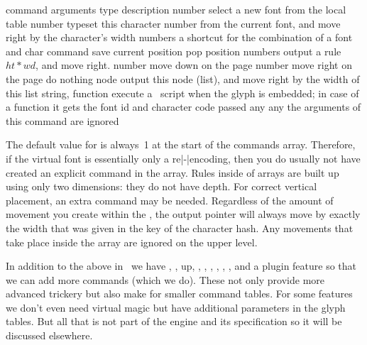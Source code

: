 {\starttabulate[|l|l|l|p|]
\FL
\BC command          \BC arguments \BC type      \BC description \NC \NR
\ML
\NC {}               \NC number    \NC select a new font from the local  table \NC \NR
\NC {}               \NC number    \NC typeset this character number from the current font,
                                                     and move right by the character's width \NC \NR
\NC {}                numbers \NC a shortcut for the combination of a font and char command\NC \NR
\NC {}               \NC           \NC save current position\NC \NR
\NC {}                \NC           \NC pop position \NC \NR
\NC {}                numbers \NC output a rule $ht*wd$, and move right. \NC \NR
\NC {}               \NC number    \NC move down on the page \NC \NR
\NC {}              \NC number    \NC move right on the page \NC \NR
\HL
\NC {}                \NC           \NC do nothing \NC \NR
\NC {}               \NC node      \NC output this node (list), and move right
                                                     by the width of this list\NC \NR
\NC {}                \NC string,
                                       function  \NC execute a \LUA\ script when the glyph is embedded; in case of a
                                                     function it gets the font id and character code passed \NC \NR
\NC {}   \NC any       \NC any       \NC the arguments of this command are ignored \NC \NR
\LL
\stoptabulate

The default value for  is always~1 at the start of the \type
{commands} array. Therefore, if the virtual font is essentially only a
re|-|encoding, then you do usually not have created an explicit 
command in the array. Rules inside of  arrays are built up using
only two dimensions: they do not have depth. For correct vertical placement, an
extra  command may be needed. Regardless of the amount of movement
you create within the , the output pointer will always move by
exactly the width that was given in the  key of the character hash.
Any movements that take place inside the  array are ignored on
the upper level.

In addition to the above in \CONTEXT\ we have , , \type
{up}, , , , , ,
,  and a plugin feature so that we can add more
commands (which we do). These not only provide more advanced trickery but also
make for smaller command tables. For some features we don't even need virtual
magic but have additional parameters in the glyph tables. But all that is not
part of the engine and its specification so it will be discussed elsewhere.

}
